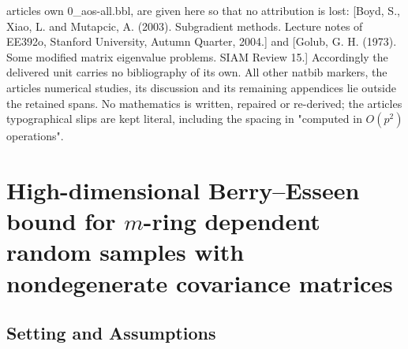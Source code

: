 \documentclass[10pt,a4paper]{amsart}
\theoremstyle{plain}
\theoremstyle{remark}
\begin{document}
article\textquotesingle s own 0\_aos-all.bbl, are given here so that no attribution is lost: [Boyd, S., Xiao, L. and Mutapcic, A. (2003). Subgradient methods. Lecture notes of EE392o, Stanford University, Autumn Quarter, 2004.] and [Golub, G. H. (1973). Some modified matrix eigenvalue problems. SIAM Review 15.] Accordingly the delivered unit carries no bibliography of its own. All other natbib markers, the article\textquotesingle s numerical studies, its discussion and its remaining appendices lie outside the retained spans. No mathematics is written, repaired or re-derived; the article\textquotesingle s typographical slips are kept literal, including the spacing in "computed in $O(p^{2})$ operations".
\setcounter{section}{1}
\section{High-dimensional Berry--Esseen bound for \texorpdfstring{$m$}{m}-ring dependent random samples with nondegenerate covariance matrices} \label{sec:theoretical_result}

 \subsection{Setting and Assumptions}\label{sec:setting_assumption}
\end{document}
